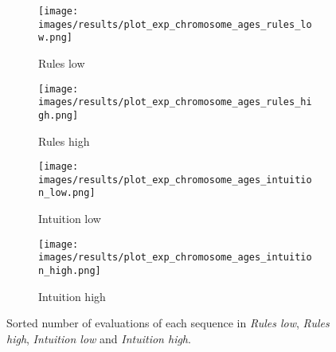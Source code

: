 \begin{figure}[ht]
	\begin{subfigure}{0.49\linewidth}
	\centering
	\texttt{[image: images/results/plot\_exp\_chromosome\_ages\_rules\_low.png]}
	\caption{Rules low}
	\label{fig:exp_age_rules_low}
	\end{subfigure}
	\hfill
	\begin{subfigure}{0.49\linewidth}
	\centering
	\texttt{[image: images/results/plot\_exp\_chromosome\_ages\_rules\_high.png]}
	\caption{Rules high}
	\label{fig:exp_age_rules_high}
	\end{subfigure}
	\begin{subfigure}{0.49\linewidth}
	\centering
	\texttt{[image: images/results/plot\_exp\_chromosome\_ages\_intuition\_low.png]}
	\caption{Intuition low}
	\label{fig:exp_age_intuition_low}
	\end{subfigure}
	\hfill
	\begin{subfigure}{0.49\linewidth}
	\centering
	\texttt{[image: images/results/plot\_exp\_chromosome\_ages\_intuition\_high.png]}
	\caption{Intuition high}
	\label{fig:exp_age_intuition_high}
	\end{subfigure}
	\caption[Sorted number of evaluations in Rules and Intuition]{Sorted number of evaluations of each sequence in \emph{Rules
	low}, \emph{Rules high}, \emph{Intuition low} and \emph{Intuition high}.}
	\label{fig:exp_ages1}
\end{figure}

